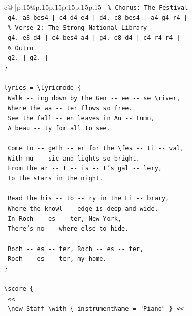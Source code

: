 \documentclass{article}
\begin{document}
{\begin{supertabular}{c@{$\;$}|p{.15\linewidth}@{}p{.15\linewidth}p{.15\linewidth}p{.15\linewidth}p{.15\linewidth}p{.15\linewidth}}
{{{\texttt{  \% Chorus: The Festival} \\
\texttt{  g4. a8 bes4 | c4 d4 e4 | d4. c8 bes4 | a4 g4 r4 |} \\
\texttt{  \% Verse 2: The Strong National Library} \\
\texttt{  g4. e8 d4 | c4 bes4 a4 | g4. e8 d4 | c4 r4 r4 |} \\
\texttt{  \% Outro} \\
\texttt{  g2. | g2. |} \\
\texttt{\}} \\
\\ 
\texttt{lyrics = \textbackslash{}lyricmode \{} \\
\texttt{  Walk {-}{-} ing down by the Gen {-}{-} ee {-}{-} se \textbackslash{}river,} \\
\texttt{  Where the wa {-}{-} ter flows so free.} \\
\texttt{  See the fall {-}{-} en leaves in Au {-}{-} tumn,} \\
\texttt{  A beau {-}{-} ty for all to see.} \\
\\ 
\texttt{  Come to {-}{-} geth {-}{-} er for the \textbackslash{}fes {-}{-} ti {-}{-} val,} \\
\texttt{  With mu {-}{-} sic and lights so bright.} \\
\texttt{  From the ar {-}{-} t {-}{-} is {-}{-} t's gal {-}{-} lery,} \\
\texttt{  To the stars in the night.} \\
\\ 
\texttt{  Read the his {-}{-} to {-}{-} ry in the Li {-}{-} brary,} \\
\texttt{  Where the knowl {-}{-} edge is deep and wide.} \\
\texttt{  In Roch {-}{-} es {-}{-} ter, New York,} \\
\texttt{  There's no {-}{-} where else to hide.} \\
\\ 
\texttt{  Roch {-}{-} es {-}{-} ter, Roch {-}{-} es {-}{-} ter,} \\
\texttt{  Roch {-}{-} es {-}{-} ter, my home.} \\
\texttt{\}} \\
\\ 
\texttt{\textbackslash{}score \{} \\
\texttt{  <<} \\
\texttt{    \textbackslash{}new Staff \textbackslash{}with \{ instrumentName = "Piano" \} <<} \\
}}}
\end{supertabular}}
\end{document}
